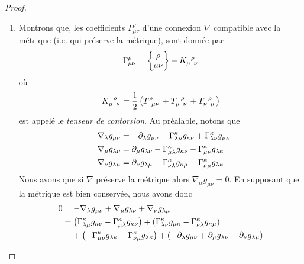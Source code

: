 \documentclass[a4paper,11pt]{report}
\begin{document}
\begin{proof}
\begin{enumerate}[label = \textit{\roman*)}]
                            \item Montrons que, les coefficients $\Gamma^\rho_{\mu\nu}$ d'une connexion $\nabla$ compatible avec la métrique (i.e. qui préserve la métrique), sont donnée par 
                            \begin{equation}
                                \Gamma^\rho_{\mu\nu} = \chris{\rho}{\mu}{\nu}+
                                K\indices{_\mu^\rho_\nu}
                            \end{equation}
                            où
                            \begin{equation}
                                K\indices{_\mu^\rho_\nu} = \frac{1}{2}\left( T\indices{^\rho_\mu_\nu}+T\indices{_\mu^\rho_\nu} + T\indices{_\nu^\rho_\mu} \right)
                            \end{equation}
                            est appelé le \textit{tenseur de contorsion}. Au préalable, notons que 
                            \begin{align}
                                -\nabla_{\lambda}g_{\mu\nu} &= -\partial_\lambda g_{\mu\nu}+\Gamma^\kappa_{\lambda\mu}g_{\kappa\nu}+\Gamma^\kappa_{\lambda\nu}g_{\mu\kappa}\\
                                \nabla_{\mu}g_{\lambda\nu} &= \partial_\mu g_{\lambda\nu}-\Gamma^\kappa_{\mu\lambda}g_{\kappa\nu}-\Gamma^\kappa_{\mu\nu}g_{\lambda\kappa}\\
                                \nabla_{\nu}g_{\lambda\mu} &= \partial_\nu g_{\lambda\mu}-\Gamma^\kappa_{\nu\lambda}g_{\kappa\mu}-\Gamma^\kappa_{\nu\mu}g_{\lambda\kappa}
                            \end{align}
                            Nous avons que si $\nabla$ préserve la métrique alors $\nabla_{\alpha}g_{\mu\nu} = 0$. En supposant que la métrique est bien conservée, nous avons donc
                            \begin{align}
                                 0 &=  -\nabla_{\lambda}g_{\mu\nu}+ \nabla_{\mu}g_{\lambda\nu}+ \nabla_{\nu}g_{\lambda\mu}\\
                                 &= \left(\Gamma^\kappa_{\lambda\mu}g_{\kappa\nu} -\Gamma^\kappa_{\mu\lambda}g_{\kappa\nu}\right) +\left(\Gamma^\kappa_{\lambda\nu}g_{\mu\kappa} -\Gamma^\kappa_{\nu\lambda}g_{\kappa\mu}\right)\\
                                 &\hspace{0.4cm}+\left(-\Gamma^\kappa_{\mu\nu}g_{\lambda\kappa}-\Gamma^\kappa_{\nu\mu}g_{\lambda\kappa}\right) + \left( -\p_\lambda g_{\mu\nu}+\p_\mu g_{\lambda\nu} + \p_\nu g_{\lambda\mu}\right)\\

\end{align}
\end{enumerate}
\end{proof}
\end{document}
